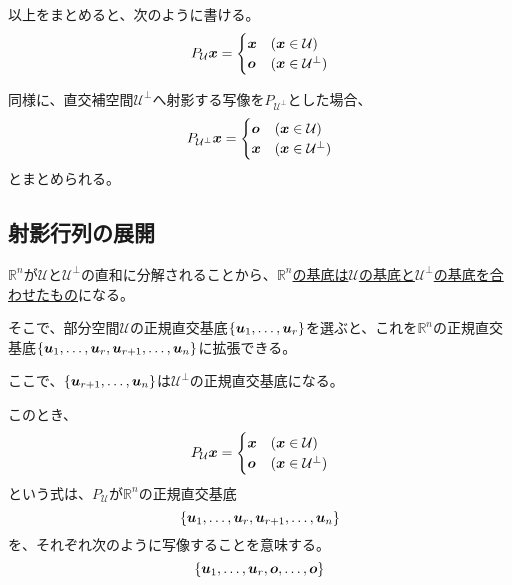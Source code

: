 \documentclass[../../../topic_linear-algebra]{subfiles}
\begin{document}
\br

以上をまとめると、次のように書ける。
\begin{equation*}
  P_{\mathcal{U}}\vb*{x} = \begin{cases}
    \vb*{x} & (\vb*{x} \in \mathcal{U})         \\
    \vb*{o} & (\vb*{x} \in \mathcal{U}^{\perp})
  \end{cases}
\end{equation*}

\br

同様に、直交補空間$\mathcal{U}^\perp$へ射影する写像を$P_{\mathcal{U}^\perp}$とした場合、
\begin{equation*}
  P_{\mathcal{U}^{\perp}}\vb*{x} = \begin{cases}
    \vb*{o} & (\vb*{x} \in \mathcal{U})         \\
    \vb*{x} & (\vb*{x} \in \mathcal{U}^{\perp})
  \end{cases}
\end{equation*}
とまとめられる。

\subsection{射影行列の展開}\label{sec:projection-matrix-expansion}

$\mathbb{R}^n$が$\mathcal{U}$と$\mathcal{U}^\perp$の直和に分解されることから、\hyperref[thm:direct-sum-and-basis]{$\mathbb{R}^n$の基底は$\mathcal{U}$の基底と$\mathcal{U}^\perp$の基底を合わせたもの}になる。

\br

そこで、部分空間$\mathcal{U}$の正規直交基底$\{\vb*{u}_1, \ldots, \vb*{u}_r\}$を選ぶと、これを$\mathbb{R}^n$の正規直交基底$\{ \vb*{u}_1, \ldots, \vb*{u}_r, \vb*{u}_{r+1}, \ldots, \vb*{u}_n \}$に拡張できる。

ここで、$\{ \vb*{u}_{r+1}, \ldots, \vb*{u}_n \}$は$\mathcal{U}^\perp$の正規直交基底になる。

\br

このとき、
\begin{equation*}
  P_{\mathcal{U}}\vb*{x} = \begin{cases}
    \vb*{x} & (\vb*{x} \in \mathcal{U})         \\
    \vb*{o} & (\vb*{x} \in \mathcal{U}^{\perp})
  \end{cases}
\end{equation*}
という式は、$P_{\mathcal{U}}$が$\mathbb{R}^n$の正規直交基底
\begin{equation*}
  \{ \vb*{u}_1, \ldots, \vb*{u}_r, \vb*{u}_{r+1}, \ldots, \vb*{u}_n \}
\end{equation*}
を、それぞれ次のように写像することを意味する。
\begin{equation*}
  \{ \vb*{u}_1, \ldots, \vb*{u}_r, \vb*{o}, \ldots, \vb*{o} \}
\end{equation*}
\end{document}
